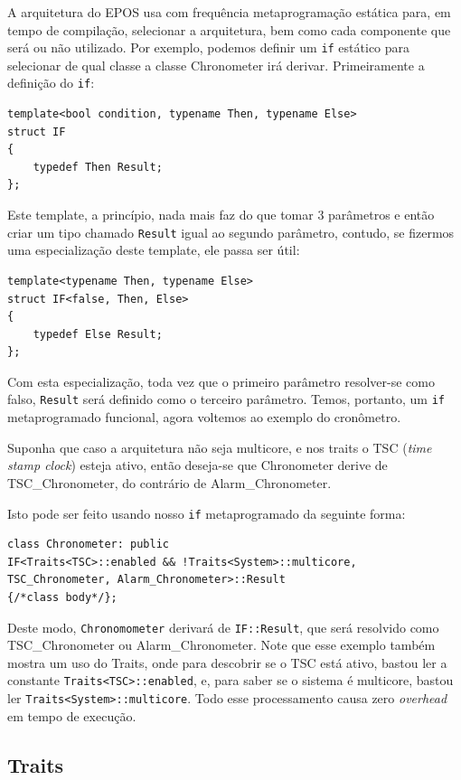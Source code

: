 A arquitetura do EPOS usa com frequência metaprogramação estática para, em tempo de compilação, selecionar a arquitetura, bem como cada componente que será ou não utilizado. Por exemplo, podemos definir um \verb+if+ estático para selecionar de qual classe a classe Chronometer irá derivar. Primeiramente a definição do \verb+if+:

\begin{lstlisting}
template<bool condition, typename Then, typename Else>
struct IF
{
    typedef Then Result;
};
\end{lstlisting}

Este template, a princípio, nada mais faz do que tomar 3 parâmetros e então criar um tipo chamado \verb+Result+ igual ao segundo parâmetro, contudo, se fizermos uma especialização deste template, ele passa ser útil:

\begin{lstlisting}
template<typename Then, typename Else>
struct IF<false, Then, Else>
{
    typedef Else Result;
};
\end{lstlisting}


Com esta especialização, toda vez que o primeiro parâmetro resolver-se como falso, \verb+Result+ será definido como o terceiro parâmetro. Temos, portanto, um \verb+if+ metaprogramado funcional, agora voltemos ao exemplo do cronômetro.

Suponha que caso a arquitetura não seja multicore, e nos traits o TSC (\emph{time stamp clock}) esteja ativo, então deseja-se que Chronometer derive de TSC\_Chronometer, do contrário de Alarm\_Chronometer.

Isto pode ser feito usando nosso \verb+if+ metaprogramado da seguinte forma:

\begin{lstlisting}
class Chronometer: public
IF<Traits<TSC>::enabled && !Traits<System>::multicore,
TSC_Chronometer, Alarm_Chronometer>::Result
{/*class body*/};
\end{lstlisting}

Deste modo, \verb+Chronomometer+ derivará de \verb+IF::Result+, que será resolvido como TSC\_Chronometer ou Alarm\_Chronometer. Note que esse exemplo também mostra um uso do Traits, onde para descobrir se o TSC está ativo, bastou ler a constante \verb+Traits<TSC>::enabled+, e, para saber se o sistema é multicore, bastou ler \verb+Traits<System>::multicore+. Todo esse processamento causa zero \emph{overhead} em tempo de execução.

\subsection{Traits}

